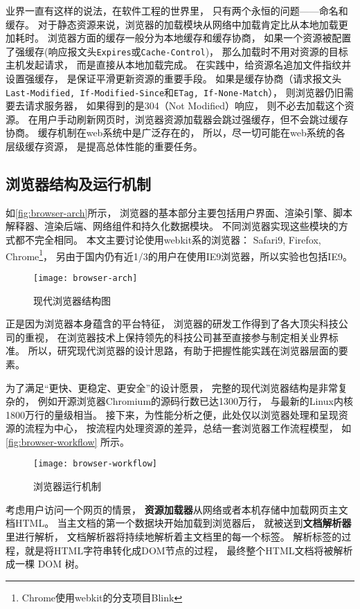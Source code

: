 业界一直有这样的说法，在软件工程的世界里，
只有两个永恒的问题——命名和缓存\cite{saternos2014client}。
对于静态资源来说，浏览器的加载模块从网络中加载肯定比从本地加载更加耗时。
浏览器方面的缓存一般分为本地缓存和缓存协商，
如果一个资源被配置了强缓存(响应报文头\texttt{Expires}或\texttt{Cache-Control})，
那么加载时不用对资源的目标主机发起请求，
而是直接从本地加载完成。
在实践中，给资源名追加文件指纹并设置强缓存，
是保证平滑更新资源的重要手段。
如果是缓存协商（请求报文头\texttt{Last-Modified, If-Modified-Since}和\texttt{ETag, If-None-Match}），
则浏览器仍旧需要去请求服务器，
如果得到的是304（Not Modified）响应，
则不必去加载这个资源。
在用户手动刷新网页时，浏览器资源加载器会跳过强缓存，但不会跳过缓存协商。
缓存机制在web系统中是广泛存在的，
所以，尽一切可能在web系统的各层级缓存资源，
是提高总体性能的重要任务。

\subsection{浏览器结构及运行机制}
如\autoref{fig:browser-arch}所示，
浏览器的基本部分主要包括用户界面、渲染引擎、脚本解释器、渲染后端、网络组件和持久化数据模块。
不同浏览器实现这些模块的方式都不完全相同。
本文主要讨论使用webkit系的浏览器：
Safari9, Firefox, Chrome\footnote{Chrome使用webkit的分支项目Blink}，
另由于国内仍有近1/3的用户在使用IE9浏览器，所以实验也包括IE9。
\begin{figure}[htbp]
	\centering
	\texttt{[image: browser-arch]}
	\caption{现代浏览器结构图}\label{fig:browser-arch}
\end{figure}

正是因为浏览器本身蕴含的平台特征，
浏览器的研发工作得到了各大顶尖科技公司的重视，
在浏览器技术上保持领先的科技公司甚至直接参与制定相关业界标准。
所以，研究现代浏览器的设计思路，有助于把握性能实践在浏览器层面的要素。

为了满足``更快、更稳定、更安全''的设计愿景，
完整的现代浏览器结构是非常复杂的，
例如开源浏览器Chromium的源码行数已达1300万行，
与最新的Linux内核1800万行的量级相当。
接下来，为性能分析之便，此处仅以浏览器处理和呈现资源的流程为中心，
按流程内处理资源的差异，总结一套浏览器工作流程模型，
如\autoref{fig:browser-workflow} 所示。
\begin{figure}[htbp]
	\centering
	\texttt{[image: browser-workflow]}
	\caption{浏览器运行机制}\label{fig:browser-workflow}
\end{figure}

考虑用户访问一个网页的情景，
\textbf{资源加载器}从网络或者本机存储中加载网页主文档HTML。
当主文档的第一个数据块开始加载到浏览器后，
就被送到\textbf{文档解析器}里进行解析，
文档解析器将持续地解析着主文档里的每一个标签。
解析标签的过程，就是将HTML字符串转化成DOM节点的过程，
最终整个HTML文档将被解析成一棵 DOM 树。

